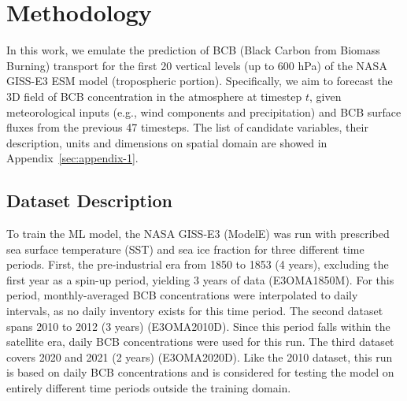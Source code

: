 \documentclass{article}
\begin{document}
\section{Methodology}
    In this work, we emulate the prediction of BCB (Black Carbon from Biomass Burning) transport for the first 20 vertical levels (up to 600 hPa) of the NASA GISS-E3 ESM model (tropospheric portion). Specifically, we aim to forecast the 3D field of BCB concentration in the atmosphere at timestep $t$, given meteorological inputs (e.g., wind components and precipitation) and BCB surface fluxes from the previous 47 timesteps. The list of candidate variables, their description, units and dimensions on spatial domain are showed in Appendix~\ref{sec:appendix-1}.
    
    \subsection{Dataset Description}
        To train the ML model, the NASA GISS-E3 (ModelE) was run with prescribed sea surface temperature (SST) and sea ice fraction for three different time periods. First, the pre-industrial era from 1850 to 1853 (4 years), excluding the first year as a spin-up period, yielding 3 years of data (E3OMA1850M). For this period, monthly-averaged BCB concentrations were interpolated to daily intervals, as no daily inventory exists for this time period. The second dataset spans 2010 to 2012 (3 years) (E3OMA2010D). Since this period falls within the satellite era, daily BCB concentrations were used for this run. The third dataset covers 2020 and 2021 (2 years) (E3OMA2020D). Like the 2010 dataset, this run is based on daily BCB concentrations and is considered for testing the model on entirely different time periods outside the training domain.
\end{document}
